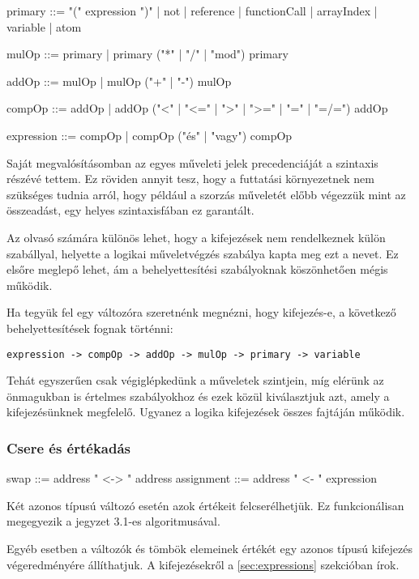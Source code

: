 \begin{ebnf}
primary ::= "(" expression ")" 
    | not 
    | reference 
    | functionCall 
    | arrayIndex 
    | variable 
    | atom

mulOp ::= primary 
    | primary ("*" | "/" | "mod") primary

addOp ::= mulOp 
    | mulOp ("+" | "-") mulOp

compOp ::= addOp 
    | addOp ("<" | "<=" | ">" | ">=" | "=" | "=/=") addOp

expression ::= compOp 
    | compOp ("és" | "vagy") compOp
\end{ebnf}

Saját megvalósításomban az egyes műveleti jelek precedenciáját a szintaxis részévé tettem. Ez röviden annyit tesz, hogy a futtatási környezetnek nem szükséges tudnia arról, hogy például a szorzás műveletét előbb végezzük mint az összeadást, egy helyes szintaxisfában ez garantált.

Az olvasó számára különös lehet, hogy a kifejezések nem rendelkeznek külön szabállyal, helyette a logikai műveletvégzés szabálya kapta meg ezt a nevet. Ez elsőre meglepő lehet, ám a behelyettesítési szabályoknak köszönhetően mégis működik.

Ha tegyük fel egy változóra szeretnénk megnézni, hogy kifejezés-e, a következő behelyettesítések fognak történni:

{\small \texttt{expression -> compOp -> addOp -> mulOp -> primary -> variable}\par}

Tehát egyszerűen csak végiglépkedünk a műveletek szintjein, míg elérünk az önmagukban is értelmes szabályokhoz és ezek közül kiválasztjuk azt, amely a kifejezésünknek megfelelő. Ugyanez a logika kifejezések összes fajtáján működik.

\subsubsection{Csere és értékadás}

\begin{ebnf}
swap ::= address " <-> " address
assignment ::= address " <- " expression
\end{ebnf}

Két azonos típusú változó esetén azok értékeit felcserélhetjük. Ez funkcionálisan megegyezik a jegyzet 3.1-es algoritmusával.

Egyéb esetben a változók és tömbök elemeinek értékét egy azonos típusú kifejezés végeredményére állíthatjuk. A kifejezésekről a \ref{sec:expressions} szekcióban írok.

